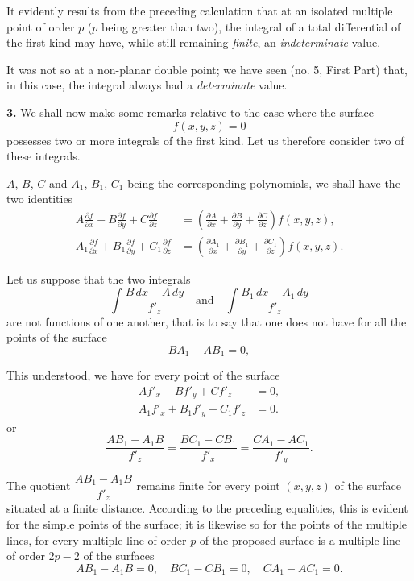 \documentclass{article}
\begin{document}
It evidently results from the preceding calculation that at an isolated multiple point of order $p$ ($p$ being greater than two), the integral of a total differential of the first kind may have, while still remaining \emph{finite}, an \emph{indeterminate} value.

It was not so at a non-planar double point; we have seen (no. 5, First Part) that, in this case, the integral always had a \emph{determinate} value.

\textbf{3.} We shall now make some remarks relative to the case where the surface
\[
f(x, y, z) = 0
\]
possesses two or more integrals of the first kind. Let us therefore consider two of these integrals.

$A$, $B$, $C$ and $A_{1}$, $B_{1}$, $C_{1}$ being the corresponding polynomials, we shall have the two identities
\[
\begin{aligned}
A \frac{\partial f}{\partial x} + B \frac{\partial f}{\partial y} + C \frac{\partial f}{\partial z} &= \left( \frac{\partial A}{\partial x} + \frac{\partial B}{\partial y} + \frac{\partial C}{\partial z} \right) f(x, y, z), \\
A_{1} \frac{\partial f}{\partial x} + B_{1} \frac{\partial f}{\partial y} + C_{1} \frac{\partial f}{\partial z} &= \left( \frac{\partial A_{1}}{\partial x} + \frac{\partial B_{1}}{\partial y} + \frac{\partial C_{1}}{\partial z} \right) f(x, y, z).
\end{aligned}
\]

Let us suppose that the two integrals
\[
\int \frac{B\,dx - A\,dy}{f'_{z}} \quad \text{and} \quad \int \frac{B_{1}\,dx - A_{1}\,dy}{f'_{z}}
\]
are not functions of one another, that is to say that one does not have for all the points of the surface
\[
BA_{1} - AB_{1} = 0,
\]

This understood, we have for every point of the surface
\[
\begin{aligned}
A f'_{x} + B f'_{y} + C f'_{z} &= 0, \\
A_{1} f'_{x} + B_{1} f'_{y} + C_{1} f'_{z} &= 0.
\end{aligned}
\]
or
\[
\frac{AB_{1} - A_{1}B}{f'_{z}} = \frac{BC_{1} - CB_{1}}{f'_{x}} = \frac{CA_{1} - AC_{1}}{f'_{y}}. \tag{1}
\]

The quotient $\dfrac{AB_{1} - A_{1}B}{f'_{z}}$ remains finite for every point $(x, y, z)$ of the surface situated at a finite distance. According to the preceding equalities, this is evident for the simple points of the surface; it is likewise so for the points of the multiple lines, for every multiple line of order $p$ of the proposed surface is a multiple line of order $2p - 2$ of the surfaces
\[
AB_{1} - A_{1}B = 0, \quad BC_{1} - CB_{1} = 0, \quad CA_{1} - AC_{1} = 0.
\]
\end{document}

